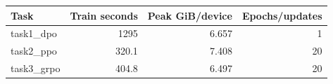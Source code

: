 \begin{center}\small
\begin{tabular}{lrrr}
\toprule
Task & Train seconds & Peak GiB/device & Epochs/updates \\
\midrule
task1\_dpo & 1295 & 6.657 & 1 \\
task2\_ppo & 320.1 & 7.408 & 20 \\
task3\_grpo & 404.8 & 6.497 & 20 \\
\bottomrule
\end{tabular}
\end{center}

